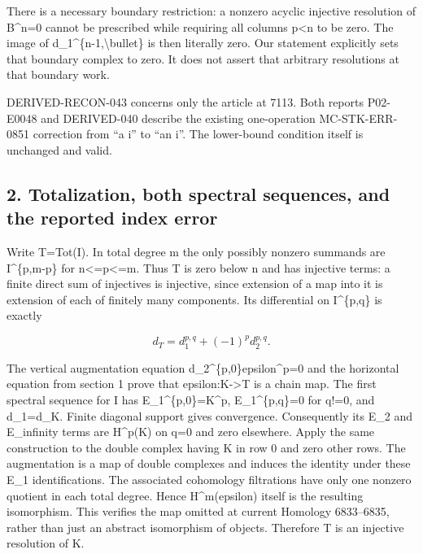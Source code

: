 \documentclass[11pt]{article}
\begin{document}
There is a necessary boundary restriction:\allowbreak{} a nonzero acyclic injective resolution of B\textasciicircum{}n\allowbreak{}=0 cannot be prescribed while requiring all columns p\textless n to be zero. The image of d\_\allowbreak{}1\textasciicircum{}\{n-1,\allowbreak{}\textbackslash{}bullet\} is then literally zero. Our statement explicitly sets that boundary complex to zero. It does not assert that arbitrary resolutions at that boundary work.

DERIVED-RECON-043 concerns only the article at 7113. Both reports P02-E0048 and DERIVED-040 describe the existing one-operation MC-STK-ERR-0851 correction from ``a i'' to ``an i''. The lower-bound condition itself is unchanged and valid.

\subsection{\texorpdfstring{2. Totalization,\allowbreak{} both spectral sequences,\allowbreak{} and the reported index error}{2.  both spectral  and the reported index error}}\label{proofs-7096-7578-totalization-both-spectral-sequences-and-the-reported-index-error}

Write T\allowbreak{}=Tot(I)\allowbreak{}. In total degree m the only possibly nonzero summands are I\textasciicircum{}\{p,\allowbreak{}m-p\} for n<\allowbreak{}=p<\allowbreak{}=m. Thus T is zero below n and has injective terms:\allowbreak{} a finite direct sum of injectives is injective,\allowbreak{} since extension of a map into it is extension of each of finitely many components. Its differential on I\textasciicircum{}\{p,\allowbreak{}q\} is exactly

\[
 d_T=d_1^{p,q}+(-1)^p d_2^{p,q}.                               \tag{2.1}
\]

The vertical augmentation equation d\_\allowbreak{}2\textasciicircum{}\{p,\allowbreak{}0\}epsilon\textasciicircum{}p\allowbreak{}=0 and the horizontal equation from section 1 prove that epsilon:\allowbreak{}K\allowbreak{}->T is a chain map. The first spectral sequence for I has E\_\allowbreak{}1\textasciicircum{}\{p,\allowbreak{}0\}\allowbreak{}=K\textasciicircum{}p,\allowbreak{} E\_\allowbreak{}1\textasciicircum{}\{p,\allowbreak{}q\}\allowbreak{}=0 for q!\allowbreak{}=0,\allowbreak{} and d\_\allowbreak{}1\allowbreak{}=d\_\allowbreak{}K. Finite diagonal support gives convergence. Consequently its E\_\allowbreak{}2 and E\_\allowbreak{}infinity terms are H\textasciicircum{}p(K)\allowbreak{} on q\allowbreak{}=0 and zero elsewhere. Apply the same construction to the double complex having K in row 0 and zero other rows. The augmentation is a map of double complexes and induces the identity under these E\_\allowbreak{}1 identifications. The associated cohomology filtrations have only one nonzero quotient in each total degree. Hence H\textasciicircum{}m(epsilon)\allowbreak{} itself is the resulting isomorphism. This verifies the map omitted at current Homology 6833–\allowbreak{}6835,\allowbreak{} rather than just an abstract isomorphism of objects. Therefore T is an injective resolution of K.
\end{document}
